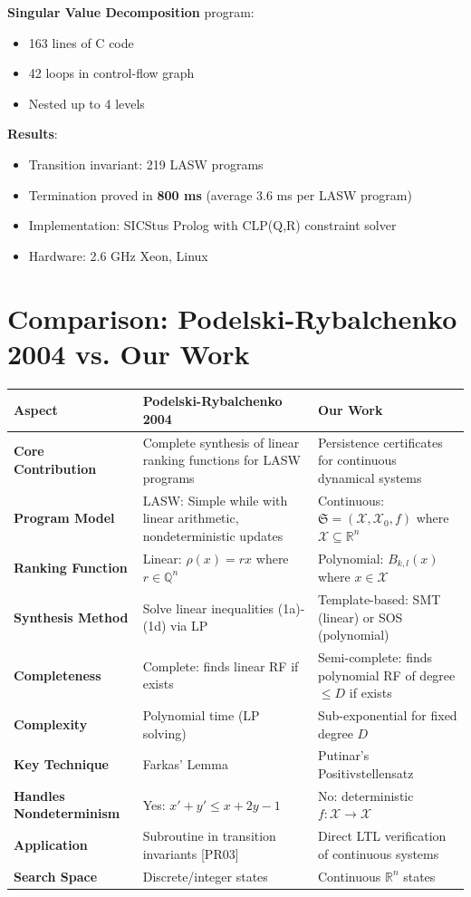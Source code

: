 \documentclass{article}
\begin{document}
\textbf{Singular Value Decomposition} program:
\begin{itemize}
    \item 163 lines of C code
    \item 42 loops in control-flow graph
    \item Nested up to 4 levels
\end{itemize}

\textbf{Results}:
\begin{itemize}
    \item Transition invariant: 219 LASW programs
    \item Termination proved in \textbf{800 ms} (average 3.6 ms per LASW program)
    \item Implementation: SICStus Prolog with CLP(Q,R) constraint solver
    \item Hardware: 2.6 GHz Xeon, Linux
\end{itemize}

\section{Comparison: Podelski-Rybalchenko 2004 vs. Our Work}

\begin{center}
\begin{tabular}{|p{3.5cm}|p{5.5cm}|p{5.5cm}|}
\hline
\textbf{Aspect} & \textbf{Podelski-Rybalchenko 2004} & \textbf{Our Work} \\
\hline
\textbf{Core Contribution} & Complete synthesis of linear ranking functions for LASW programs & Persistence certificates for continuous dynamical systems \\
\hline
\textbf{Program Model} & LASW: Simple while with linear arithmetic, nondeterministic updates & Continuous: $\mathfrak{S} = (\mathcal{X}, \mathcal{X}_0, f)$ where $\mathcal{X} \subseteq \mathbb{R}^n$ \\
\hline
\textbf{Ranking Function} & Linear: $\rho(x) = rx$ where $r \in \mathbb{Q}^n$ & Polynomial: $B_{k,l}(x)$ where $x \in \mathcal{X}$ \\
\hline
\textbf{Synthesis Method} & Solve linear inequalities (1a)-(1d) via LP & Template-based: SMT (linear) or SOS (polynomial) \\
\hline
\textbf{Completeness} & Complete: finds linear RF if exists & Semi-complete: finds polynomial RF of degree $\leq D$ if exists \\
\hline
\textbf{Complexity} & Polynomial time (LP solving) & Sub-exponential for fixed degree $D$ \\
\hline
\textbf{Key Technique} & Farkas' Lemma & Putinar's Positivstellensatz \\
\hline
\textbf{Handles Nondeterminism} & Yes: $x' + y' \leq x + 2y - 1$ & No: deterministic $f: \mathcal{X} \to \mathcal{X}$ \\
\hline
\textbf{Application} & Subroutine in transition invariants [PR03] & Direct LTL verification of continuous systems \\
\hline
\textbf{Search Space} & Discrete/integer states & Continuous $\mathbb{R}^n$ states \\
\hline
\end{tabular}
\end{center}
\end{document}
